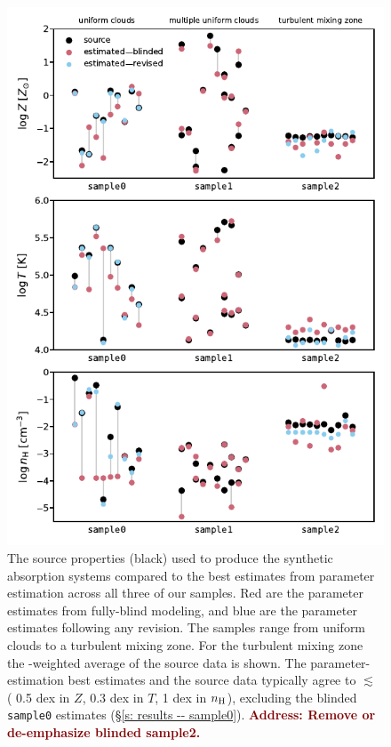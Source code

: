 \documentclass[fleqn,usenatbib]{mnras}
\newcommand{\todo}[1]{\textcolor{Maroon}{\textbf{Address: #1}}}
\begin{document}
\begin{figure}
    \centering
    \includegraphics[width=\columnwidth]{figures/averages.pdf}
    \caption{
    The source properties (black) used to produce the synthetic absorption systems
    compared to the best estimates from parameter estimation across all three of our samples.
    Red are the parameter estimates from fully-blind modeling,
    and blue are the parameter estimates following any revision.
    The samples range from uniform clouds to a turbulent mixing zone.
    For the turbulent mixing zone the -weighted average of the source data is shown.
    The parameter-estimation best estimates and the source data typically agree to $\lesssim$ ( 0.5 dex in $Z$, 0.3 dex in $T$, 1 dex in $n_{\rm H}$),
    excluding the blinded \texttt{sample0} estimates (\S\ref{s: results -- sample0}).
    \todo{Remove or de-emphasize blinded sample2.}
    }
    \label{f: summary--average}
\end{figure}
\end{document}

